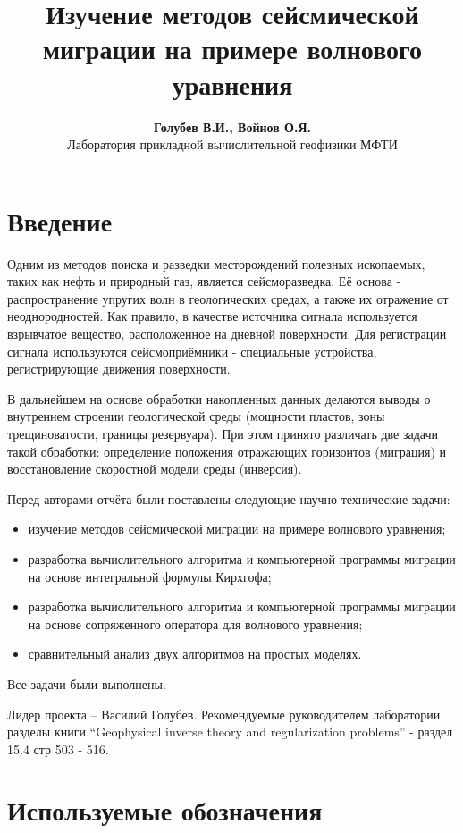 \documentclass{article}
\begin{document}
\title{Изучение методов сейсмической миграции на примере волнового уравнения}
\author{\textbf{Голубев В.И., Войнов О.Я.} \\ Лаборатория прикладной вычислительной геофизики МФТИ}
\maketitle

\section{Введение}

Одним из методов поиска и разведки месторождений полезных ископаемых, таких как нефть и природный газ, является сейсморазведка.
Её основа - распространение упругих волн в геологических средах, а также их отражение от неоднородностей.
Как правило, в качестве источника сигнала используется взрывчатое вещество, расположенное на дневной поверхности.
Для регистрации сигнала используются сейсмоприёмники - специальные устройства, регистрирующие движения поверхности.

В дальнейшем на основе обработки накопленных данных делаются выводы о внутреннем строении геологической среды (мощности пластов,
зоны трещиноватости, границы резервуара).
При этом принято различать две задачи такой обработки: определение положения отражающих горизонтов (миграция) и восстановление скоростной модели среды (инверсия).

Перед авторами отчёта были поставлены следующие научно-технические задачи:
\begin{itemize}
\item изучение методов сейсмической миграции на примере волнового уравнения;
\item разработка вычислительного алгоритма и компьютерной программы миграции на основе интегральной формулы Кирхгофа;
\item разработка вычислительного алгоритма и компьютерной программы миграции на основе сопряженного оператора для волнового уравнения;
\item сравнительный анализ двух алгоритмов на простых моделях.
\end{itemize}

Все задачи были выполнены.

Лидер проекта – Василий Голубев.
Рекомендуемые руководителем лаборатории разделы книги “Geophysical inverse theory and regularization problems” - раздел 15.4 стр 503 - 516.

\section{Используемые обозначения}
\end{document}
